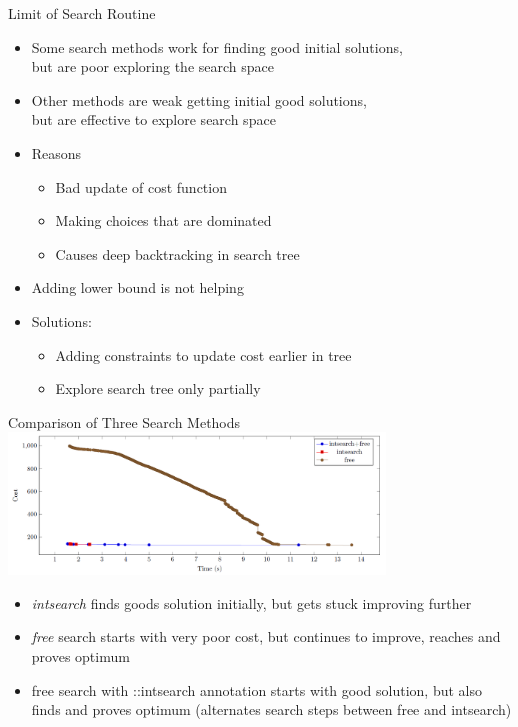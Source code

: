 \documentclass[dvipsnames,aspectratio=169]{beamer}
\begin{document}
  \begin{frame}{Limit of Search Routine}
  \begin{itemize}   
  \item Some search methods work for finding good initial solutions,\\ but are poor exploring the search space
  \item Other methods are weak getting initial good solutions,\\ but are effective to explore search space
  \item Reasons
  \begin{itemize}
  \item Bad update of cost function
  \item Making choices that are dominated
  \item Causes deep backtracking in search tree
  \end{itemize}
  \item Adding lower bound is not helping
    \item Solutions: 
    \begin{itemize}
        \item Adding constraints to update cost earlier in tree
        \item Explore search tree only partially
    \end{itemize}
  \end{itemize}
\end{frame}


\begin{frame}{Comparison of Three Search Methods}
\includegraphics[width=10cm]{images/flowsearchcompare}   
\begin{itemize}
    \item \emph{intsearch} finds goods solution initially, but gets stuck improving further
    \item \emph{free} search starts with very poor cost, but continues to improve, reaches and proves optimum
    \item free search with ::intsearch annotation starts with good solution, but also finds and proves optimum (alternates search steps between free and intsearch)
\end{itemize}

\end{frame}
\end{document}
